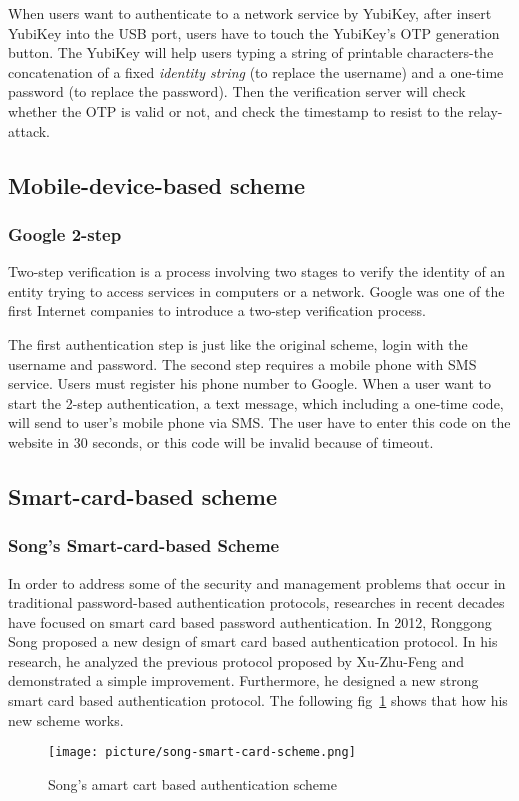\begin{CJK}{Bg5}{bsmi}
When users want to authenticate to a network service by YubiKey, after insert YubiKey into the USB port, users have to touch the YubiKey's OTP generation button. The YubiKey will help users typing a string of printable characters-the concatenation of a fixed \emph{identity string} (to replace the username) and a one-time password (to replace the password). Then the verification server will check whether the OTP is valid or not, and check the timestamp to resist to the relay-attack.

\subsection{Mobile-device-based scheme}

\subsubsection{Google 2-step}

Two-step verification is a process involving two stages to verify the identity of an entity trying to access services in computers or a network. Google was one of the first Internet companies to introduce a two-step verification process\cite{google-2-step}. 

The first authentication step is just like the original scheme, login with the username and password. The second step requires a mobile phone with SMS service. Users must register his phone number to Google. When a user want to start the 2-step authentication, a text message, which including a one-time code, will send to user's mobile phone via SMS. The user have to enter this code on the website in 30 seconds, or this code will be invalid because of timeout.

\subsection{Smart-card-based scheme}

\subsubsection{Song's Smart-card-based Scheme}

In order to address some of the security and management problems that occur in traditional password-based authentication protocols, researches in recent decades have focused on smart card based password authentication. In 2012, Ronggong Song proposed a new design of smart card based authentication protocol\cite{smart-card}. In his research, he analyzed the previous protocol proposed by Xu-Zhu-Feng and demonstrated a simple improvement. Furthermore, he designed a new strong smart card based authentication protocol. The following fig~\ref{fig:song-smard-card-scheme} shows that how his new scheme works.

\begin{figure}
\centering
\texttt{[image: picture/song-smart-card-scheme.png]}
\caption{Song's amart cart based authentication scheme}
\label{fig:song-smard-card-scheme}
\end{figure}
\end{CJK}